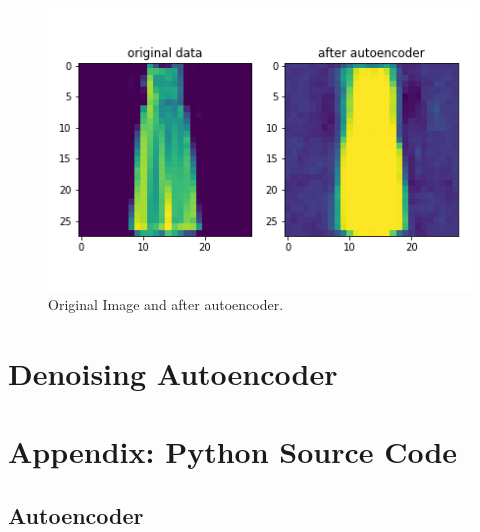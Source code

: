 \documentclass[11pt,a4paper,oneside]{article}
\begin{document}
\begin{figure}[!btp]
	\centering
	\includegraphics[width=.6\textwidth]{figures/save_ev_9}
	\caption{Original Image and after autoencoder.}
\end{figure}

\section{Denoising Autoencoder}


\FloatBarrier

\newpage
\section{Appendix: Python Source Code}
\label{sec:app}

\subsection{Autoencoder}


\end{document}
